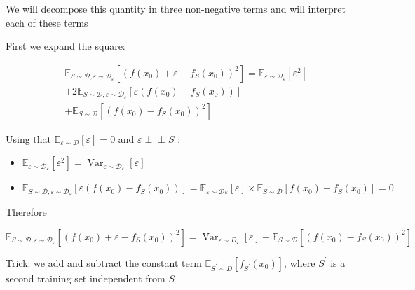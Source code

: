 \documentclass[10pt]{article}
\def\Perp{\perp\!\!\!\perp}
\begin{document}
We will decompose this quantity in three non-negative terms and will interpret each of these terms

First we expand the square:

$$
\begin{aligned}
& \mathbb{E}_{S \sim \mathscr{D}, \varepsilon \sim \mathscr{D}_{\varepsilon}}\left[\left(f\left(x_{0}\right)+\varepsilon-f_{S}\left(x_{0}\right)\right)^{2}\right]=\mathbb{E}_{\varepsilon \sim \mathscr{D}_{\varepsilon}}\left[\varepsilon^{2}\right] \\
&+2 \mathbb{E}_{S \sim \mathscr{D}, \varepsilon \sim \mathscr{D}_{\varepsilon}}\left[\varepsilon\left(f\left(x_{0}\right)-f_{S}\left(x_{0}\right)\right)\right] \\
&+\mathbb{E}_{S \sim \mathscr{D}}\left[\left(f\left(x_{0}\right)-f_{S}\left(x_{0}\right)\right)^{2}\right]
\end{aligned}
$$

Using that $\mathbb{E}_{\varepsilon \sim \mathscr{D}}[\varepsilon]=0$ and $\varepsilon \Perp S$ :

\begin{itemize}
  \item $\mathbb{E}_{\varepsilon \sim \mathscr{D}_{\varepsilon}}\left[\varepsilon^{2}\right]=\operatorname{Var}_{\varepsilon \sim \mathscr{D}_{\varepsilon}}[\varepsilon]$
  \item $\mathbb{E}_{S \sim \mathscr{D}, \varepsilon \sim \mathscr{D}_{\varepsilon}}\left[\varepsilon\left(f\left(x_{0}\right)-f_{S}\left(x_{0}\right)\right)\right]=\mathbb{E}_{\varepsilon \sim \mathscr{D} \varepsilon}[\varepsilon] \times \mathbb{E}_{S \sim \mathscr{D}}\left[f\left(x_{0}\right)-f_{S}\left(x_{0}\right)\right]=0$
\end{itemize}

Therefore

$\mathbb{E}_{S \sim \mathscr{D}, \varepsilon \sim \mathscr{D}_{\varepsilon}}\left[\left(f\left(x_{0}\right)+\varepsilon-f_{S}\left(x_{0}\right)\right)^{2}\right]=\operatorname{Var}_{\varepsilon \sim D_{\varepsilon}}[\varepsilon]+\mathbb{E}_{S \sim \mathscr{D}}\left[\left(f\left(x_{0}\right)-f_{S}\left(x_{0}\right)\right)^{2}\right]$

Trick: we add and subtract the constant term $\mathbb{E}_{S^{\prime} \sim D}\left[f_{S^{\prime}}\left(x_{0}\right)\right]$, where $S^{\prime}$ is a second training set independent from $S$
\end{document}
